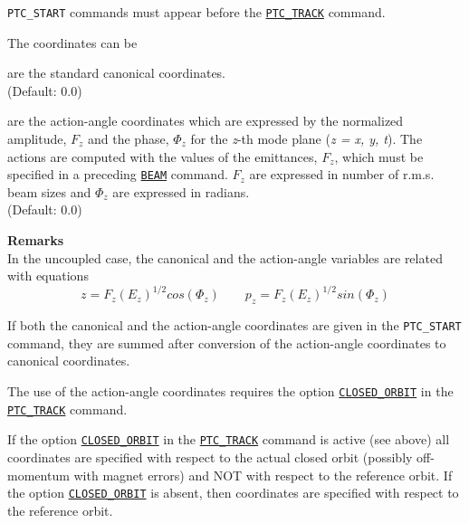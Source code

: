 {\tt PTC\_START} commands must appear before the
\hyperref[sec:ptc_track]{\tt PTC\_TRACK} command. 


The coordinates can be 

\begin{madlist}
    are the standard canonical
   coordinates. \\ (Default: 0.0)  

    are the action-angle
   coordinates which are expressed by the normalized amplitude, $F_z$ and
   the phase, $\Phi_z$ for the \textit{z}-th mode plane 
   (\textit{z = x, y, t}).
   The actions are computed with the values of the emittances,
   $F_z$, which must be specified in a preceding 
   \hyperref[sec:beam]{\tt BEAM} command. $F_z$ are expressed in number
   of r.m.s. beam sizes and $\Phi_z$ are expressed in
   radians.\\ (Default: 0.0) 
\end{madlist}


{\bf Remarks} \\
In the uncoupled case, the canonical and the action-angle
variables are related with equations 
\begin{equation} 
z = F_z (E_z)^{1/2} cos(\Phi_z) \qquad  p_z = F_z (E_z)^{1/2} sin(\Phi_z)
\end{equation}

If both the canonical and the action-angle coordinates are 
given in the {\tt PTC\_START} command, they are summed after conversion
of the action-angle coordinates to canonical coordinates.

The use of the action-angle coordinates requires the option 
\hyperref[opt:closed_orbit]{\tt CLOSED\_ORBIT} in the 
\hyperref[sec:ptc_track]{\tt PTC\_TRACK} command. 

If the option
\hyperref[opt:closed_orbit]{\tt CLOSED\_ORBIT} in the
\hyperref[sec:ptc_track]{\tt PTC\_TRACK} command is active
(see above) all coordinates are specified with respect to the actual
closed orbit (possibly off-momentum with magnet errors) and NOT with
respect to the reference orbit. 
If the option \hyperref[opt:closed_orbit]{\tt CLOSED\_ORBIT} is absent,
then coordinates are specified with respect to the reference orbit.  



